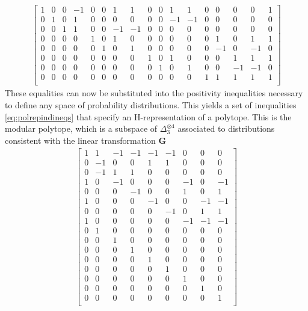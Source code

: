 \begin{equation}\label{eq:kceqsrefa}
\begin{aligned}
\begin{bmatrix}
  1 & 0 & 0 & -1 & 0 & 0 & 1 & 1 & 0 & 0 & 1 & 1 & 0 & 0 & 0 & 0 & 1\\
  0 & 1 & 0 & 1 & 0 & 0 & 0 & 0 & 0 & 0 & -1 & -1 & 0 & 0 & 0 & 0 & 0\\
  0 & 0 & 1 & 1 & 0 & 0 & -1 & -1 & 0 & 0 & 0 & 0 & 0 & 0 & 0 & 0 & 0\\
  0 & 0 & 0 & 0 & 1 & 0 & 1 & 0 & 0 & 0 & 0 & 0 & 0 & 1 & 0 & 1 & 1\\
  0 & 0 & 0 & 0 & 0 & 1 & 0 & 1 & 0 & 0 & 0 & 0 & 0 & -1 & 0 & -1 & 0\\
  0 & 0 & 0 & 0 & 0 & 0 & 0 & 0 & 1 & 0 & 1 & 0 & 0 & 0 & 1 & 1 & 1\\
  0 & 0 & 0 & 0 & 0 & 0 & 0 & 0 & 0 & 1 & 0 & 1 & 0 & 0 & -1 & -1 & 0\\
  0 & 0 & 0 & 0 & 0 & 0 & 0 & 0 & 0 & 0 & 0 & 0 & 1 & 1 & 1 & 1 & 1\\
\end{bmatrix}
\end{aligned}
\end{equation}
These equalities can now be substituted into the positivity inequalities necessary to define any space of probability distributions. This yields a set of inequalities \ref{eq:polrepindineqs} that specify an H-representation of a polytope. This is the modular polytope, which is a subspace of $\Delta_3^{\otimes 4}$ associated to distributions consistent with the linear transformation $\mathbf{G}$
\begin{equation}\label{eq:polrepindineqs}
\begin{aligned}
\begin{bmatrix}
  1 & 1 & -1 & -1 & -1 & -1 & 0 & 0 & 0\\
  0 & -1 & 0 & 0 & 1 & 1 & 0 & 0 & 0\\
  0 & -1 & 1 & 1 & 0 & 0 & 0 & 0 & 0\\
  1 & 0 & -1 & 0 & 0 & 0 & -1 & 0 & -1\\
  0 & 0 & 0 & -1 & 0 & 0 & 1 & 0 & 1\\
  1 & 0 & 0 & 0 & -1 & 0 & 0 & -1 & -1\\
  0 & 0 & 0 & 0 & 0 & -1 & 0 & 1 & 1\\
  1 & 0 & 0 & 0 & 0 & 0 & -1 & -1 & -1\\
  0 & 1 & 0 & 0 & 0 & 0 & 0 & 0 & 0\\
  0 & 0 & 1 & 0 & 0 & 0 & 0 & 0 & 0\\
  0 & 0 & 0 & 1 & 0 & 0 & 0 & 0 & 0\\
  0 & 0 & 0 & 0 & 1 & 0 & 0 & 0 & 0\\
  0 & 0 & 0 & 0 & 0 & 1 & 0 & 0 & 0\\
  0 & 0 & 0 & 0 & 0 & 0 & 1 & 0 & 0\\
  0 & 0 & 0 & 0 & 0 & 0 & 0 & 1 & 0\\
  0 & 0 & 0 & 0 & 0 & 0 & 0 & 0 & 1\\
\end{bmatrix}
\end{aligned}
\end{equation}

